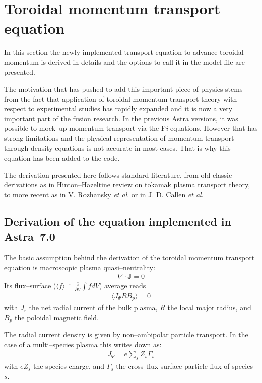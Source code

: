 
\section{Toroidal momentum transport equation}
In this section the newly implemented transport equation to advance toroidal 
momentum is derived in details and the options to call it in the model file are
presented. 

The motivation that has pushed to add this important piece of physics stems from
the fact that application of toroidal momentum transport theory with respect to 
experimental studies has rapidly expanded and it is now a very important part of
the fusion research. In the previous Astra versions, it was possible to mock--up
momentum transport via the F{\it i} equations. However that has strong 
limitations and the physical representation of momentum transport through 
density equations is not accurate in most cases. That is why this equation has
been added to the code.

The derivation presented here follows standard literature, from old classic derivations as in Hinton--Hazeltine review on tokamak plasma transport theory, to more recent as in V. Rozhansky {\it et al}. or in J. D. Callen {\it et al}.
%
\subsection{Derivation of the equation implemented in Astra--7.0}
The basic assumption behind the derivation of the toroidal momentum transport equation is macroscopic plasma quasi--neutrality:
\begin{eqnarray}
\nabla \cdot \mathbf{J} = 0
\label{qneutraldivjeq0}
\end{eqnarray}
Its flux--surface ($\displaystyle \langle f \rangle \doteq \frac{\partial}{\partial{V}}\int{f dV}$) average reads 
\begin{eqnarray}
\langle J_\Psi R B_p \rangle=0
\label{qneutraldivjeq0fsa}
\end{eqnarray}
with $J_r$ the 
net radial current of the bulk plasma, $R$ the local major radius, and $B_p$ the
poloidal magnetic field.

The radial current density is given by non--ambipolar particle transport. In the case of a multi--species plasma this writes down as:
\begin{eqnarray}
J_\Psi =e\sum_s Z_s \Gamma_s 
\label{jpsimultispecpartsum}
\end{eqnarray}
with $e Z_s$ the species charge, and $\Gamma_s$ the cross--flux surface particle flux of species $s$. 
%
